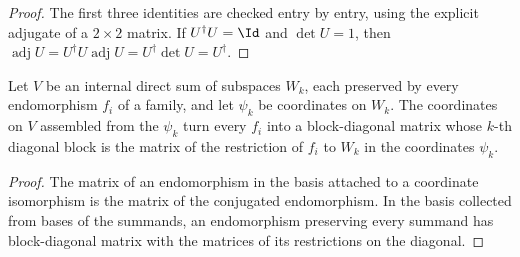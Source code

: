 \begin{proof}\leanok
    The first three identities are checked entry by entry, using the explicit
    adjugate of a $2\times2$ matrix. If $U^\dagger U=\Id$ and $\det U=1$,
    then $\operatorname{adj}U=U^\dagger U\operatorname{adj}U
        =U^\dagger\det U=U^\dagger$.
\end{proof}

\begin{lemma}
    \label{thm:characters_direct_sum_block_diagonal}
    \leanok
    Let $V$ be an internal direct sum of subspaces $W_k$, each preserved by
    every endomorphism $f_i$ of a family, and let $\psi_k$ be coordinates on
    $W_k$. The coordinates on $V$ assembled from the $\psi_k$ turn every
    $f_i$ into a block-diagonal matrix whose $k$-th diagonal block is the
    matrix of the restriction of $f_i$ to $W_k$ in the coordinates $\psi_k$.
\end{lemma}

\begin{proof}\leanok
    The matrix of an endomorphism in the basis attached to a coordinate
    isomorphism is the matrix of the conjugated endomorphism. In the basis
    collected from bases of the summands, an endomorphism preserving every
    summand has block-diagonal matrix with the matrices of its restrictions
    on the diagonal.
\end{proof}
